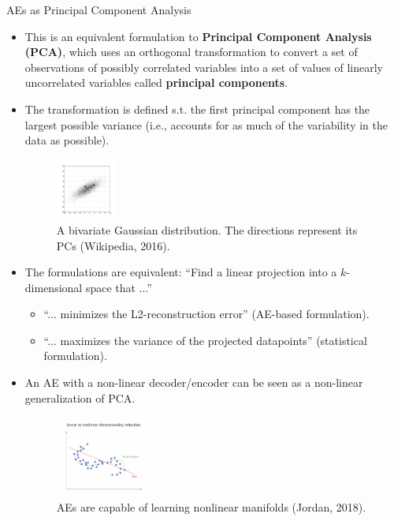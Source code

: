 \begin{vbframe}{AEs as Principal Component Analysis}
\begin{itemize}
    \framebreak 

    \item This is an equivalent formulation to \textbf{Principal Component Analysis (PCA)}, which uses an orthogonal transformation to convert a set of observations of possibly correlated variables into a set of values of linearly uncorrelated variables called \textbf{principal components}. 
    \item The transformation is defined s.t. the first principal component has the largest possible variance (i.e., accounts for as much of the variability in the data as possible).  
    \begin{figure}
    \centering
    \includegraphics[width=2.0cm]{plots/PCA.png}
    \caption{A bivariate Gaussian distribution. The directions represent its PCs (Wikipedia, 2016).}
    \end{figure}

    \framebreak 

    \item The formulations are equivalent: \enquote{Find a linear projection into a $k$-dimensional space that ...}
    \begin{itemize}
      \item \enquote{... minimizes the L2-reconstruction error} (AE-based formulation).
      \item \enquote{... maximizes the variance of the projected datapoints} (statistical formulation). 
    \end{itemize}
  

    \item An AE with a non-linear decoder/encoder can be seen as a non-linear generalization of PCA.

    \vspace*{-0.2cm}

    \begin{figure}
    \begin{center}
    \includegraphics[width=0.3\textwidth]{plots/manifold1.png}
    \caption{AEs are capable of learning nonlinear manifolds (Jordan, 2018).}
    \end{center}
    \end{figure}

  \end{itemize}
  
\end{vbframe}


